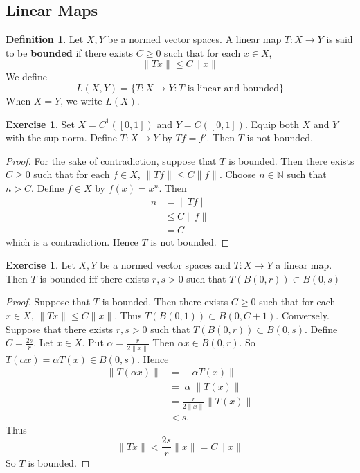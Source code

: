 \documentclass[12pt]{amsart}
\theoremstyle{definition}
\newtheorem{defn}[definition]{Definition}
\newtheorem{ex}[definition]{Exercise}
\newcommand{\al}{\alpha}
\newcommand{\N}{\mathbb{N}}
\newcommand{\lex}[1]{\label{ex:#1}}
\newcommand{\ld}[1]{\label{defn:#1}}
\begin{document}
	
	
	
	
	
	
	
	
	
	
	
	
	\newpage
	\subsection{Linear Maps}
	
	\begin{defn} \ld{42001} 
		Let $X,Y$ be a normed vector spaces. A linear map $T:X \rightarrow Y$ is said to be \textbf{bounded} if there exists $C \geq 0$ such that for each $x \in X$, $$\|Tx \|\leq C \|x \|$$ We define $$L(X,Y) = \{T:X \rightarrow Y: T \text{ is linear and bounded}\}$$
		When $X=Y$, we write $L(X)$.
	\end{defn}
	
	\begin{ex} \lex{42002}
	Set $X = C^{1}([0,1])$ and $Y = C([0,1])$. Equip both $X$ and $Y$ with the sup norm. Define $T:X \rightarrow Y$ by $Tf = f'$. Then $T$ is not bounded.
	\end{ex}
	
	\begin{proof}
	For the sake of contradiction, suppose that $T$ is bounded. Then there exists $C \geq 0$ such that for each $f \in X$, $\|Tf\| \leq C \|f\|$. Choose $n \in \N$ such that $n > C$. Define $f \in X$ by $f(x) = x^n$. Then
	\begin{align*}
	n
	&= \|Tf\| \\
	&\leq C \|f\| \\
	&= C
\end{align*}		
	which is a contradiction. Hence $T$ is not bounded.
	\end{proof}
	
	\begin{ex} \lex{42003}
		Let $X,Y$ be a normed vector spaces and $T:X \rightarrow Y$ a linear map. Then $T$ is bounded iff there exists $r,s>0$ such that $T(B(0,r)) \subset B(0,s)$
	\end{ex}
	
	\begin{proof}
		Suppose that $T$ is bounded. Then there exists $C \geq 0$ such that for each $x \in X$, $\|Tx \|\leq C \|x \|$. Thus $T(B(0,1)) \subset B(0,C+1)$. Conversely. Suppose that there exists $r,s >0$ such that $T(B(0,r)) \subset B(0,s)$. Define $C = \frac{2s}{r}$. Let $x \in X$. Put $\al = \frac{r}{2\|x \|}$ Then $\al x \in B(0,r)$. So $T(\al x ) = \al T(x) \in B(0,s)$. Hence 
		\begin{align*}
			\|T(\al x) \|
			&= \|\al T(x) \|\\
			&= \vert \al \vert \|T(x) \|\\
			& = \frac{r}{2 \|x \|}  \|T(x) \|\\
			& < s.
		\end{align*}
		Thus $$\|Tx \|< \frac{2 s}{r} \|x \|= C \|x \|$$ So $T$ is bounded. 
	\end{proof}
	
\end{document}
